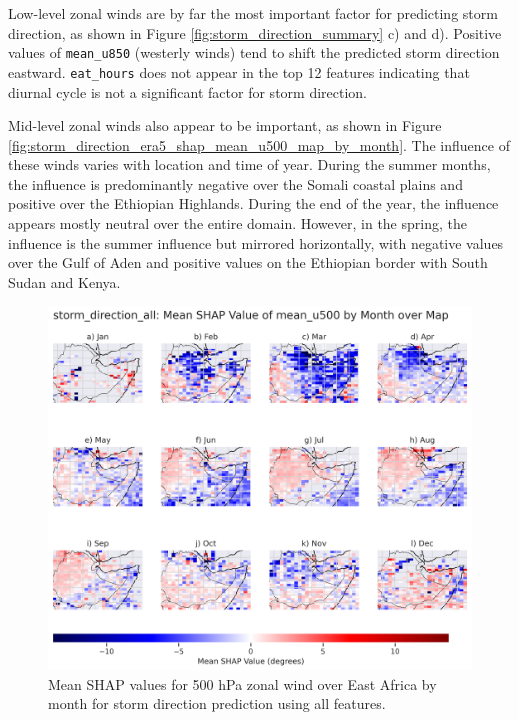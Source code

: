 Low-level zonal winds are by far the most important factor for predicting storm direction, as shown in Figure \ref{fig:storm_direction_summary} c) and d). Positive values of \texttt{mean\_u850} (westerly winds) tend to shift the predicted storm direction eastward. \texttt{eat\_hours} does not appear in the top 12 features indicating that diurnal cycle is not a significant factor for storm direction.

Mid-level zonal winds also appear to be important, as shown in Figure \ref{fig:storm_direction_era5_shap_mean_u500_map_by_month}. The influence of these winds varies with location and time of year. During the summer months, the influence is predominantly negative over the Somali coastal plains and positive over the Ethiopian Highlands. During the end of the year, the influence appears mostly neutral over the entire domain. However, in the spring, the influence is the summer influence but mirrored horizontally, with negative values over the Gulf of Aden and positive values on the Ethiopian border with South Sudan and Kenya.

\begin{figure}[h]
    \centering
    \includegraphics[width=\textwidth]{../figures/generated/experiments/storm_direction/geographic_corr/storm_direction_all_shap_mean_u500_map_by_month.png}
    \caption{Mean SHAP values for 500 hPa zonal wind over East Africa by month for storm direction prediction using all features.}
    \label{fig:storm_direction_all_shap_mean_u500_map_by_month}
\end{figure}


